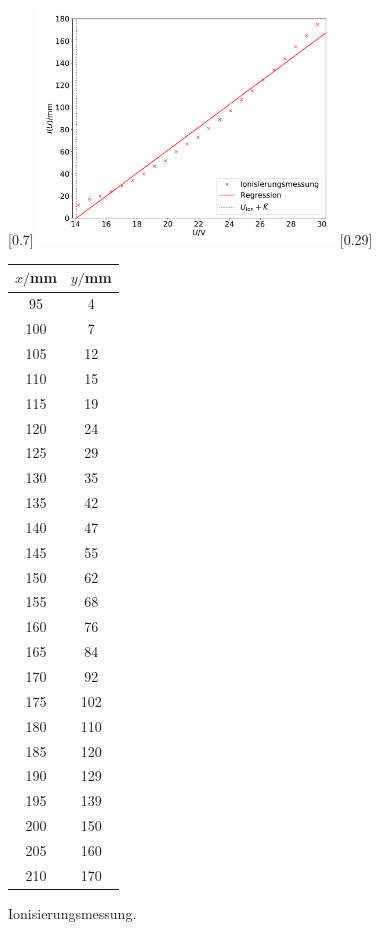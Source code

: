 \begin{figure}
  \centering
  [0.7\textwidth]{
    \includegraphics[width=0.7\textwidth]{Ion.pdf}
    }
  \hfill
  [0.29\textwidth]{
    \begin{tabular}{c c}
      \toprule
      $x/$\si{\milli\metre} & $y/$\si{\milli\metre}\\
      \midrule
      95 & 4 \\
      100 & 7 \\
      105 & 12 \\
      110 & 15 \\
      115 & 19 \\
      120 & 24 \\
      125 & 29 \\
      130 & 35 \\
      135 & 42 \\
      140 & 47 \\
      145 & 55 \\
      150 & 62 \\
      155 & 68 \\
      160 & 76 \\
      165 & 84 \\
      170 & 92 \\
      175 & 102 \\
      180 & 110 \\
      185 & 120 \\
      190 & 129 \\
      195 & 139 \\
      200 & 150 \\
      205 & 160 \\
      210 & 170 \\
      \bottomrule
    \end{tabular}
    }
  \hfill
  \caption{Ionisierungsmessung.}
\end{figure}
